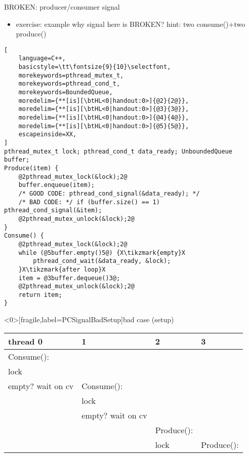\begin{frame}[fragile,label=PCSignal]{BROKEN: producer/consumer signal}
\begin{itemize}
\item exercise: example why signal here is BROKEN? hint: two consume()+two produce()
\end{itemize}
\begin{lstlisting}[
    language=C++,
    basicstyle=\tt\fontsize{9}{10}\selectfont,
    morekeywords=pthread_mutex_t,
    morekeywords=pthread_cond_t,
    morekeywords=BoundedQueue,
    moredelim={**[is][\btHL<0|handout:0>]{@2}{2@}}, 
    moredelim={**[is][\btHL<0|handout:0>]{@3}{3@}}, 
    moredelim={**[is][\btHL<0|handout:0>]{@4}{4@}}, 
    moredelim={**[is][\btHL<0|handout:0>]{@5}{5@}}, 
    escapeinside=XX,
]
pthread_mutex_t lock; pthread_cond_t data_ready; UnboundedQueue buffer;
Produce(item) {
    @2pthread_mutex_lock(&lock);2@
    buffer.enqueue(item);
    /* GOOD CODE: pthread_cond_signal(&data_ready); */
    /* BAD CODE: */ if (buffer.size() == 1) pthread_cond_signal(&item);
    @2pthread_mutex_unlock(&lock);2@
}
Consume() {
    @2pthread_mutex_lock(&lock);2@
    while (@5buffer.empty()5@) {X\tikzmark{empty}X
        pthread_cond_wait(&data_ready, &lock);
    }X\tikzmark{after loop}X
    item = @3buffer.dequeue()3@;
    @2pthread_mutex_unlock(&lock);2@
    return item;
}
\end{lstlisting}
\end{frame}

\begin{frame}<0>[fragile,label=PCSignalBadSetup]{bad case (setup)}
\fontsize{12}{13}\selectfont
\begin{tabular}{l|l|l|l}
thread 0 & 1 & 2 & 3 \\ \hline
Consume(): & & \\
lock & & \\
empty? wait on cv & Consume(): \\
     & lock & \\
     & empty? wait on cv & & \\
     & & Produce(): & \\
     & & lock & Produce(): \\
\end{tabular}
\end{frame}

